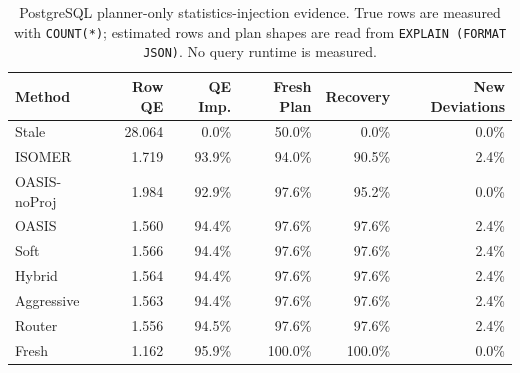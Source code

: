\begin{table}[t]
  \centering
  \small
  \caption{PostgreSQL planner-only statistics-injection evidence. True rows are measured with \texttt{COUNT(*)}; estimated rows and plan shapes are read from \texttt{EXPLAIN (FORMAT JSON)}. No query runtime is measured.}
  \label{tab:postgres_planner_stats_injection}
  \setlength{\tabcolsep}{4pt}
  \begin{tabular}{lrrrrr}
    \toprule
    Method & Row QE & QE Imp. & Fresh Plan & Recovery & New Deviations \\
    \midrule
    Stale & 28.064 & 0.0\% & 50.0\% & 0.0\% & 0.0\% \\
    ISOMER & 1.719 & 93.9\% & 94.0\% & 90.5\% & 2.4\% \\
    OASIS-noProj & 1.984 & 92.9\% & 97.6\% & 95.2\% & 0.0\% \\
    OASIS & 1.560 & 94.4\% & 97.6\% & 97.6\% & 2.4\% \\
    Soft & 1.566 & 94.4\% & 97.6\% & 97.6\% & 2.4\% \\
    Hybrid & 1.564 & 94.4\% & 97.6\% & 97.6\% & 2.4\% \\
    Aggressive & 1.563 & 94.4\% & 97.6\% & 97.6\% & 2.4\% \\
    Router & 1.556 & 94.5\% & 97.6\% & 97.6\% & 2.4\% \\
    Fresh & 1.162 & 95.9\% & 100.0\% & 100.0\% & 0.0\% \\
    \bottomrule
  \end{tabular}
\end{table}
